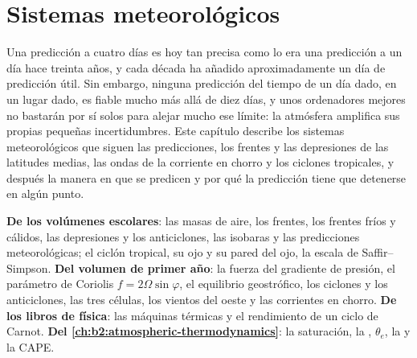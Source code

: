 \chapter{Sistemas meteorológicos}\label{ch:b2:weather-systems}

Una predicción a cuatro días es hoy tan precisa como lo era una predicción a un día hace treinta
años, y cada década ha añadido aproximadamente un día de predicción útil. Sin embargo, ninguna predicción del
tiempo de un día dado, en un lugar dado, es fiable mucho más allá de diez días, y unos ordenadores mejores
no bastarán por sí solos para alejar mucho ese límite: la atmósfera amplifica sus propias pequeñas incertidumbres. Este
capítulo describe los sistemas meteorológicos que siguen las predicciones, los frentes y las depresiones de las
latitudes medias, las ondas de la corriente en chorro y los ciclones tropicales, y después la manera en que se
predicen y por qué la predicción tiene que detenerse en algún punto.

\begin{recall}
\textbf{De los volúmenes escolares}: las masas de aire, los frentes, los frentes fríos y cálidos, las depresiones y
los anticiclones, las isobaras y las predicciones meteorológicas; el ciclón tropical, su ojo y su pared del ojo, la
escala de Saffir--Simpson. \textbf{Del volumen de primer año}: la fuerza del gradiente de presión, el
parámetro de Coriolis $f = 2\Omega\sin\varphi$, el equilibrio geostrófico, los ciclones y los anticiclones, las
tres células, los vientos del oeste y las corrientes en chorro. \textbf{De los libros de física}: las máquinas térmicas
y el rendimiento de un ciclo de Carnot. \textbf{Del \cref{ch:b2:atmospheric-thermodynamics}}:
la saturación, la , $\theta_e$, la  y la CAPE.
\end{recall}

